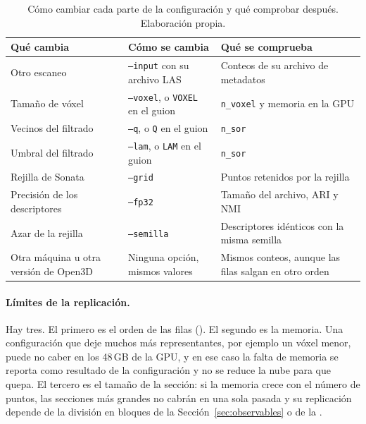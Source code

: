 \begin{table}[!htbp]
\centering
{}\small
\caption[Cómo cambiar cada parte de la configuración]{Cómo cambiar cada parte de la configuración y qué comprobar después. Elaboración propia.}
\label{tab:replica}
\begin{tabularx}{\linewidth}{@{}>{\raggedright\arraybackslash\hsize=0.8\hsize}X>{\raggedright\arraybackslash\hsize=1.1\hsize}X>{\raggedright\arraybackslash\hsize=1.1\hsize}X@{}}
\toprule
\textbf{Qué cambia} & \textbf{Cómo se cambia} & \textbf{Qué se comprueba} \\
\midrule
Otro escaneo & \texttt{--input} con su archivo LAS & Conteos de su archivo de metadatos \\
Tamaño de vóxel & \texttt{--voxel}, o \texttt{VOXEL} en el guion & \texttt{n\_voxel} y memoria en la GPU \\
Vecinos del filtrado & \texttt{--q}, o \texttt{Q} en el guion & \texttt{n\_sor} \\
Umbral del filtrado & \texttt{--lam}, o \texttt{LAM} en el guion & \texttt{n\_sor} \\
Rejilla de Sonata & \texttt{--grid} & Puntos retenidos por la rejilla \\
Precisión de los descriptores & \texttt{--fp32} & Tamaño del archivo, ARI y NMI \\
Azar de la rejilla & \texttt{--semilla} & Descriptores idénticos con la misma semilla \\
Otra máquina u otra versión de Open3D & Ninguna opción, mismos valores & Mismos conteos, aunque las filas salgan en otro orden \\
\bottomrule
\end{tabularx}
\end{table}

\paragraph*{Límites de la replicación.}
Hay tres. El primero es el orden de las filas
(). El segundo es la memoria. Una
configuración que deje muchos más representantes, por ejemplo un vóxel menor,
puede no caber en los 48\,GB de la GPU, y en ese caso la falta de memoria se
reporta como resultado de la configuración y no se reduce la nube para que
quepa. El tercero es el tamaño de la sección: si la memoria crece con el número
de puntos, las secciones más grandes no cabrán en una sola pasada y su
replicación depende de la división en bloques de la
Sección~\ref{sec:observables} o de la .

